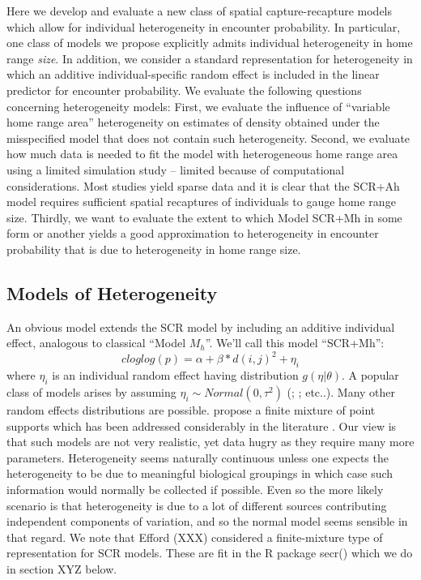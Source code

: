 Here we develop and evaluate a new class of spatial capture-recapture
models which allow for individual heterogeneity in encounter
probability.  In particular, one class of models we propose explicitly
admits individual heterogeneity in home range {\it size}. In addition,
we consider a standard representation for heterogeneity in which an
additive individual-specific random effect is included in the linear
predictor for encounter probability.  We evaluate the following
questions concerning heterogeneity models: First, we evaluate the
influence of ``variable home range area'' heterogeneity on estimates
of density obtained under the misspecified model that does not contain
such heterogeneity.  Second, we evaluate how much data is needed to
fit the model with heterogeneous home range area using a limited
simulation study -- limited because of computational considerations.
Most studies yield sparse data and it is clear that the SCR+Ah model
requires sufficient spatial recaptures of individuals to gauge home
range size.  Thirdly, we want to evaluate the extent to which Model
SCR+Mh in some form or another yields a good approximation to
heterogeneity in encounter probability that is due to heterogeneity in
home range size.

\subsection{Models of Heterogeneity}

An obvious model extends the SCR model by including an additive individual effect, analogous to classical ``Model $M_{h}$''. We'll call this model ``SCR+Mh'':
\[
 cloglog(p) = \alpha + \beta*d(i,j)^2  + \eta_{i}
\]
where $\eta_{i}$ is an individual random effect having distribution
$g(\eta|\theta)$.  A popular class of models arises by assuming
$\eta_{i} \sim Normal(0,\tau^{2})$ (\citet{coull_agresti:1999};
\citet{dorazio_royle:2003}; etc..).  Many other random effects
distributions are possible. \citet{norris_pollock:1996} propose a
finite mixture of point supports which has been addressed considerably
in the literature \citep{pledger:2003, dorazio_royle:2003, link:2003}.  Our view is that such models are not very realistic, yet data hugry as they require many more parameters. Heterogeneity seems naturally continuous unless one expects the heterogeneity to be due to meaningful biological groupings in which case such information would normally be collected if possible.  Even so the more likely scenario is that heterogeneity is due to a lot of different sources contributing independent components of variation, and so the normal model seems sensible in that regard. We note that Efford (XXX) considered a finite-mixture type of representation for SCR models. These are fit in the R package secr() which we do in section XYZ below.

